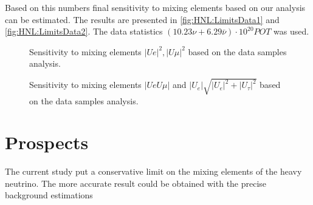 \documentclass[../main.tex]{subfiles}
\begin{document}
Based on this numbers final sensitivity to mixing elements based on our analysis can be estimated. The results are presented in \autoref{fig:HNL:LimitsData1} and \autoref{fig:HNL:LimitsData2}. The data statistics $\left(10.23\nu+6.29\bar{\nu}\right)\cdot 10^{20}POT$ was used.

\begin{figure}[!ht]
    \begin{center}
  \begin{minipage}{0.49\linewidth}
  \end{minipage}
  \hfill
  \begin{minipage}{0.49\linewidth}
  \end{minipage}
  \caption{Sensitivity to mixing elements $\left|Ue\right|^2, \left|U\mu\right|^2$ based on the data samples analysis.}
  \label{fig:HNL:LimitsData1}
    \end{center}
\end{figure}

\begin{figure}[!ht]
    \begin{center}
  \begin{minipage}{0.49\linewidth}
  \end{minipage}
  \begin{minipage}{0.49\linewidth}
  \end{minipage}
  \caption{Sensitivity to mixing elements $\left|UeU\mu\right|$ and $\left|U_{e}\right|\sqrt{\left|U_{e}\right|^2+\left|U_{\tau}\right|^2}$ based on the data samples analysis.}
  \label{fig:HNL:LimitsData2}
  \end{center}
\end{figure}

\clearpage
\section{Prospects}
\label{sec:HNL:prosp}
The current study put a conservative limit on the mixing elements of the heavy neutrino. The more accurate result could be obtained with the precise background estimations
\end{document}
